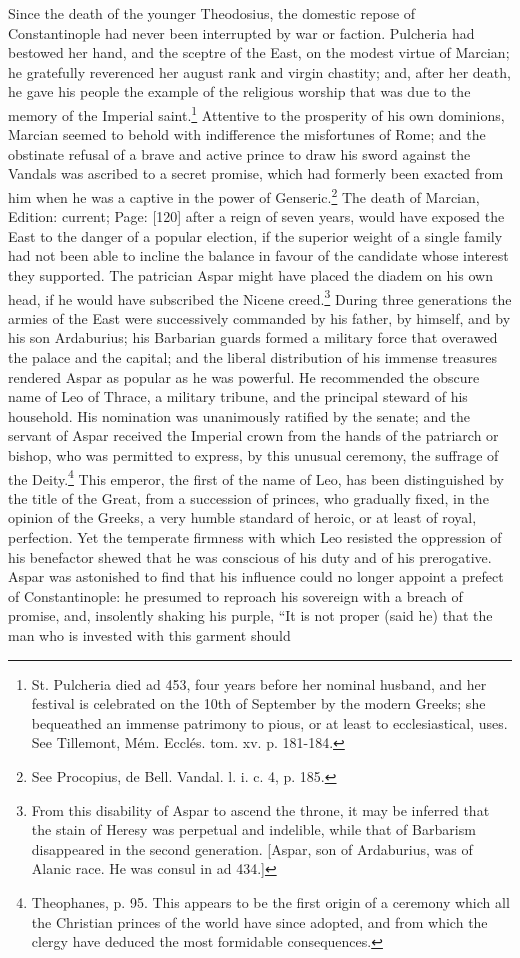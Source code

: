 Since the death of the younger Theodosius, the domestic repose of Constantinople had never been interrupted by war or faction. Pulcheria had bestowed her hand, and the sceptre of the East, on the modest virtue of Marcian; he gratefully reverenced her august rank and virgin chastity; and, after her death, he gave his people the example of the religious worship that was due to the memory of the Imperial saint.\footnote{St. Pulcheria died ad 453, four years before her nominal husband, and her festival is celebrated on the 10th of September by the modern Greeks; she bequeathed an immense patrimony to pious, or at least to ecclesiastical, uses. See Tillemont, Mém. Ecclés. tom. xv. p. 181-184.} Attentive to the prosperity of his own dominions, Marcian seemed to behold with indifference the misfortunes of Rome; and the obstinate refusal of a brave and active prince to draw his sword against the Vandals was ascribed to a secret promise, which had formerly been exacted from him when he was a captive in the power of Genseric.\footnote{See Procopius, de Bell. Vandal. l. i. c. 4, p. 185.} The death of Marcian, Edition: current; Page: [120] after a reign of seven years, would have exposed the East to the danger of a popular election, if the superior weight of a single family had not been able to incline the balance in favour of the candidate whose interest they supported. The patrician Aspar might have placed the diadem on his own head, if he would have subscribed the Nicene creed.\footnote{From this disability of Aspar to ascend the throne, it may be inferred that the stain of Heresy was perpetual and indelible, while that of Barbarism disappeared in the second generation. [Aspar, son of Ardaburius, was of Alanic race. He was consul in ad 434.]} During three generations the armies of the East were successively commanded by his father, by himself, and by his son Ardaburius; his Barbarian guards formed a military force that overawed the palace and the capital; and the liberal distribution of his immense treasures rendered Aspar as popular as he was powerful. He recommended the obscure name of Leo of Thrace, a military tribune, and the principal steward of his household. His nomination was unanimously ratified by the senate; and the servant of Aspar received the Imperial crown from the hands of the patriarch or bishop, who was permitted to express, by this unusual ceremony, the suffrage of the Deity.\footnote{Theophanes, p. 95. This appears to be the first origin of a ceremony which all the Christian princes of the world have since adopted, and from which the clergy have deduced the most formidable consequences.} This emperor, the first of the name of Leo, has been distinguished by the title of the Great, from a succession of princes, who gradually fixed, in the opinion of the Greeks, a very humble standard of heroic, or at least of royal, perfection. Yet the temperate firmness with which Leo resisted the oppression of his benefactor shewed that he was conscious of his duty and of his prerogative. Aspar was astonished to find that his influence could no longer appoint a prefect of Constantinople: he presumed to reproach his sovereign with a breach of promise, and, insolently shaking his purple, \texthebrew{“}It is not proper (said he) that the man who is invested with this garment should 